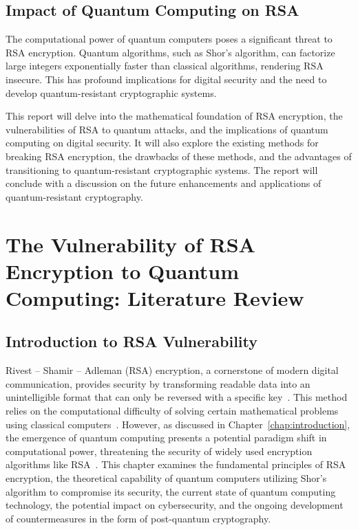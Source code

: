 \documentclass[12pt,a4paper]{report}
\begin{document}
\section{Impact of Quantum Computing on RSA}
The computational power of quantum computers poses a significant threat to RSA encryption. Quantum algorithms, such as Shor's algorithm, can factorize large integers exponentially faster than classical algorithms, rendering RSA insecure. This has profound implications for digital security and the need to develop quantum-resistant cryptographic systems.

This report will delve into the mathematical foundation of RSA encryption, the vulnerabilities of RSA to quantum attacks, and the implications of quantum computing on digital security. It will also explore the existing methods for breaking RSA encryption, the drawbacks of these methods, and the advantages of transitioning to quantum-resistant cryptographic systems. The report will conclude with a discussion on the future enhancements and applications of quantum-resistant cryptography.

\chapter{The Vulnerability of RSA Encryption to Quantum Computing: Literature Review}

\section{Introduction to RSA Vulnerability}
Rivest -- Shamir -- Adleman (RSA) encryption, a cornerstone of modern digital communication, provides security by transforming readable data into an unintelligible format that can only be reversed with a specific key~\cite{Okta}. This method relies on the computational difficulty of solving certain mathematical problems using classical computers~\cite{SecureW2}. However, as discussed in Chapter~\ref{chap:introduction}, the emergence of quantum computing presents a potential paradigm shift in computational power, threatening the security of widely used encryption algorithms like RSA~\cite{AuthoreaImplementation}. This chapter examines the fundamental principles of RSA encryption, the theoretical capability of quantum computers utilizing Shor's algorithm to compromise its security, the current state of quantum computing technology, the potential impact on cybersecurity, and the ongoing development of countermeasures in the form of post-quantum cryptography.
\end{document}
